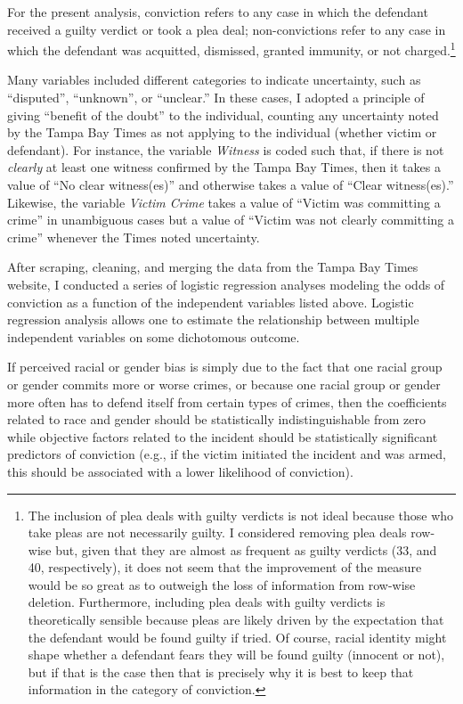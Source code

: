 \documentclass[12pt,article]{article}
\begin{document}
For the present analysis, conviction refers to any case in which the
defendant received a guilty verdict or took a plea deal; non-convictions
refer to any case in which the defendant was acquitted, dismissed,
granted immunity, or not charged.\footnote{The inclusion of plea deals
  with guilty verdicts is not ideal because those who take pleas are not
  necessarily guilty. I considered removing plea deals row-wise but,
  given that they are almost as frequent as guilty verdicts (33, and 40,
  respectively), it does not seem that the improvement of the measure
  would be so great as to outweigh the loss of information from row-wise
  deletion. Furthermore, including plea deals with guilty verdicts is
  theoretically sensible because pleas are likely driven by the
  expectation that the defendant would be found guilty if tried. Of
  course, racial identity might shape whether a defendant fears they
  will be found guilty (innocent or not), but if that is the case then
  that is precisely why it is best to keep that information in the
  category of conviction.}

Many variables included different categories to indicate uncertainty,
such as ``disputed'', ``unknown'', or ``unclear.'' In these cases, I
adopted a principle of giving ``benefit of the doubt'' to the
individual, counting any uncertainty noted by the Tampa Bay Times as not
applying to the individual (whether victim or defendant). For instance,
the variable \emph{Witness} is coded such that, if there is not
\emph{clearly} at least one witness confirmed by the Tampa Bay Times,
then it takes a value of ``No clear witness(es)'' and otherwise takes a
value of ``Clear witness(es).'' Likewise, the variable \emph{Victim
Crime} takes a value of ``Victim was committing a crime'' in unambiguous
cases but a value of ``Victim was not clearly committing a crime''
whenever the Times noted uncertainty.

After scraping, cleaning, and merging the data from the Tampa Bay Times
website, I conducted a series of logistic regression analyses modeling
the odds of conviction as a function of the independent variables listed
above. Logistic regression analysis allows one to estimate the
relationship between multiple independent variables on some dichotomous
outcome.

If perceived racial or gender bias is simply due to the fact that one
racial group or gender commits more or worse crimes, or because one
racial group or gender more often has to defend itself from certain
types of crimes, then the coefficients related to race and gender should
be statistically indistinguishable from zero while objective factors
related to the incident should be statistically significant predictors
of conviction (e.g., if the victim initiated the incident and was armed,
this should be associated with a lower likelihood of conviction).
\end{document}
